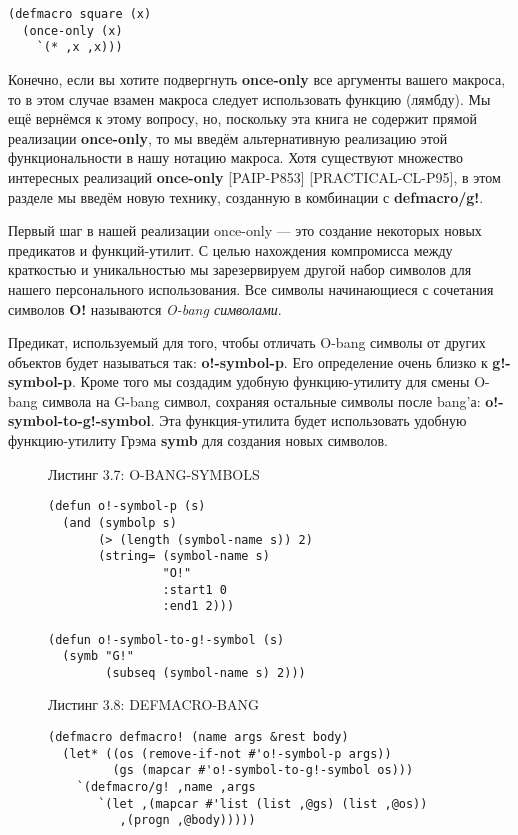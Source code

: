 \begin{verbatim}
(defmacro square (x)
  (once-only (x)
    `(* ,x ,x)))
\end{verbatim}

Конечно, если вы хотите подвергнуть \textbf{once-only} все аргументы вашего макроса, то в этом случае взамен макроса следует использовать функцию (лямбду). Мы ещё вернёмся к этому вопросу, но, поскольку эта книга не содержит прямой реализации \textbf{once-only}, то мы введём альтернативную реализацию этой функциональности в нашу нотацию макроса. Хотя существуют множество интересных реализаций \textbf{once-only} [PAIP-P853] [PRACTICAL-CL-P95], в этом разделе мы введём новую технику, созданную в комбинации с \textbf{defmacro/g!}.

Первый шаг в нашей реализации once-only --- это создание некоторых новых предикатов и функций-утилит. С целью нахождения компромисса между краткостью и уникальностью мы зарезервируем другой набор символов для нашего персонального использования. Все символы начинающиеся с сочетания символов \textbf{O!} называются \emph{O-bang символами}.

Предикат, используемый для того, чтобы отличать O-bang символы от других объектов будет называться так: \textbf{o!-symbol-p}. Его определение очень близко к \textbf{g!-symbol-p}. Кроме того мы создадим удобную функцию-утилиту для смены O-bang символа на G-bang символ, сохраняя остальные символы после bang'а: \textbf{o!-symbol-to-g!-symbol}. Эта функция-утилита будет использовать удобную функцию-утилиту Грэма \textbf{symb} для создания новых символов.

\begin{figure}Листинг 3.7: O-BANG-SYMBOLS\label{listing_3.7}
\listbegin
\begin{verbatim}
(defun o!-symbol-p (s)
  (and (symbolp s)
       (> (length (symbol-name s)) 2)
       (string= (symbol-name s)
                "O!"
                :start1 0
                :end1 2)))

(defun o!-symbol-to-g!-symbol (s)
  (symb "G!"
        (subseq (symbol-name s) 2)))
\end{verbatim}
\listend
\end{figure}

\begin{figure}Листинг 3.8: DEFMACRO-BANG\label{listing_3.8}
\listbegin
\begin{verbatim}
(defmacro defmacro! (name args &rest body)
  (let* ((os (remove-if-not #'o!-symbol-p args))
         (gs (mapcar #'o!-symbol-to-g!-symbol os)))
    `(defmacro/g! ,name ,args
       `(let ,(mapcar #'list (list ,@gs) (list ,@os))
          ,(progn ,@body)))))
\end{verbatim}
\listend
\end{figure}

